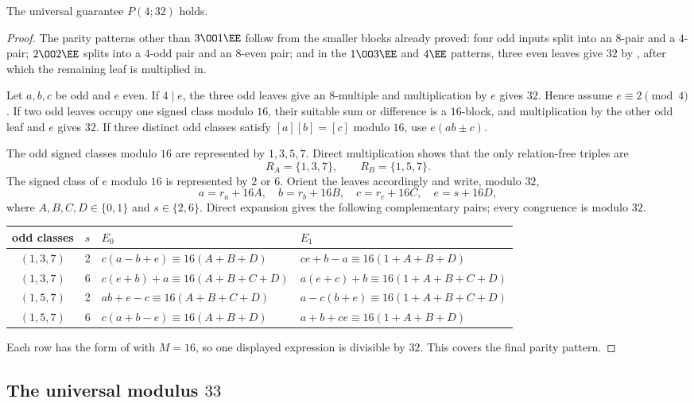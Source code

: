 \begin{theorem}\label{thm:p32}
The universal guarantee $P(4;32)$ holds.
\end{theorem}
\begin{proof}
The parity patterns other than $3\OO1\EE$ follow from the smaller
blocks already proved: four odd inputs split into an $8$-pair and a $4$-pair; $2\OO2\EE$
splits into a $4$-odd pair and an $8$-even pair; and in the $1\OO3\EE$ and
$4\EE$ patterns, three even leaves give $32$ by
, after which the remaining leaf is multiplied in.

Let $a,b,c$ be odd and $e$ even.  If $4\mid e$, the three odd leaves give an
$8$-multiple and multiplication by $e$ gives $32$.  Hence assume
$e\equiv2\pmod4$.  If two odd leaves occupy one signed class modulo $16$,
their suitable sum or difference is a $16$-block, and multiplication by the
other odd leaf and $e$ gives $32$.  If three distinct odd classes satisfy
$[a][b]=[c]$ modulo $16$, use $e(ab\pm c)$.

The odd signed classes modulo $16$ are represented by $1,3,5,7$.  Direct
multiplication shows that the only relation-free triples are
\[
 R_A=\{1,3,7\},\qquad R_B=\{1,5,7\}.
\]
The signed class of $e$ modulo $16$ is represented by $2$ or $6$.  Orient the
leaves accordingly and write, modulo $32$,
\[
 a=r_a+16A,\quad b=r_b+16B,\quad c=r_c+16C,
 \quad e=s+16D,
\]
where $A,B,C,D\in\{0,1\}$ and $s\in\{2,6\}$.  Direct expansion gives the
following complementary pairs; every congruence is modulo $32$.
\small
\begin{center}
\begin{tabular}{@{}ccll@{}}
\toprule
odd classes & $s$ & $E_0$ & $E_1$ \\
\midrule
$(1,3,7)$&2&$c(a-b+e)\equiv16(A+B+D)$&$ce+b-a\equiv16(1+A+B+D)$\\
$(1,3,7)$&6&$c(e+b)+a\equiv16(A+B+C+D)$&$a(e+c)+b\equiv16(1+A+B+C+D)$\\
$(1,5,7)$&2&$ab+e-c\equiv16(A+B+C+D)$&$a-c(b+e)\equiv16(1+A+B+C+D)$\\
$(1,5,7)$&6&$c(a+b-e)\equiv16(A+B+D)$&$a+b+ce\equiv16(1+A+B+D)$\\
\bottomrule
\end{tabular}
\end{center}
\normalsize
Each row has the form of  with $M=16$, so one displayed
expression is divisible by $32$.  This covers the final parity pattern.
\end{proof}

\subsection{\texorpdfstring{The universal modulus $33$}{The universal modulus 33}}\label{app:p33}

